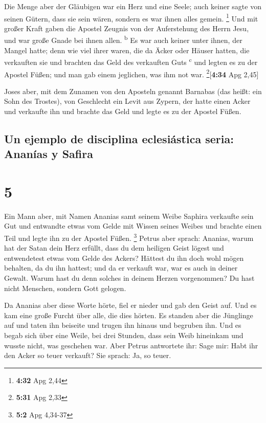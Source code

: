  Die Menge aber der Gläubigen war ein Herz und eine
Seele; auch keiner sagte von seinen Gütern, dass sie sein wären, sondern
es war ihnen alles gemein. \footnote{\textbf{4:32} Apg 2,44}
 Und mit großer Kraft gaben die Apostel Zeugnis von der
Auferstehung des Herrn Jesu, und war große Gnade bei ihnen allen.
\textsuperscript{b}  Es war auch keiner unter ihnen, der
Mangel hatte; denn wie viel ihrer waren, die da Äcker oder Häuser
hatten, die verkauften sie und brachten das Geld des verkauften Guts
\textsuperscript{c}  und legten es zu der Apostel Füßen;
und man gab einem jeglichen, was ihm not war.
\footnote{\textbf{5:31} Apg 2,33}{[}\textbf{4:34} Apg 2,45{]}

 Joses aber, mit dem Zunamen von den Aposteln genannt
Barnabas (das heißt: ein Sohn des Trostes), von Geschlecht ein Levit aus
Zypern,  der hatte einen Acker und verkaufte ihn und
brachte das Geld und legte es zu der Apostel Füßen.

\hypertarget{un-ejemplo-de-disciplina-eclesiuxe1stica-seria-ananuxedas-y-safira}{%
\subsection{Un ejemplo de disciplina eclesiástica seria: Ananías y
Safira}\label{un-ejemplo-de-disciplina-eclesiuxe1stica-seria-ananuxedas-y-safira}}

\hypertarget{section-4}{%
\section{5}\label{section-4}}

 Ein Mann aber, mit Namen Ananias samt seinem Weibe
Saphira verkaufte sein Gut  und entwandte etwas vom Gelde
mit Wissen seines Weibes und brachte einen Teil und legte ihn zu der
Apostel Füßen. \footnote{\textbf{5:2} Apg 4,34-37}  Petrus
aber sprach: Ananias, warum hat der Satan dein Herz erfüllt, dass du dem
heiligen Geist lögest und entwendetest etwas vom Gelde des Ackers?
 Hättest du ihn doch wohl mögen behalten, da du ihn
hattest; und da er verkauft war, war es auch in deiner Gewalt. Warum
hast du denn solches in deinem Herzen vorgenommen? Du hast nicht
Menschen, sondern Gott gelogen.

 Da Ananias aber diese Worte hörte, fiel er nieder und gab
den Geist auf. Und es kam eine große Furcht über alle, die dies hörten.
 Es standen aber die Jünglinge auf und taten ihn beiseite
und trugen ihn hinaus und begruben ihn.  Und es begab sich
über eine Weile, bei drei Stunden, dass sein Weib hineinkam und wusste
nicht, was geschehen war.  Aber Petrus antwortete ihr:
Sage mir: Habt ihr den Acker so teuer verkauft? Sie sprach: Ja, so
teuer.

